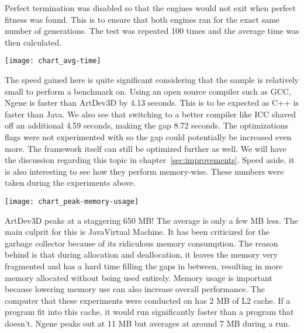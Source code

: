 Perfect termination was disabled so that the engines would not exit when perfect fitness was found. This is to ensure that both engines ran for the exact same number of generations. The test was repeated 100 times and the average time was then calculated.

\begin{center}\texttt{[image: chart\_avg-time]}\end{center}

The speed gained here is quite significant considering that the sample is relatively small to perform a benchmark on. Using an open source compiler such as GCC, Ngene is faster than ArtDev3D by 4.13 seconds. This is to be expected as C++ is faster than Java. We also see that switching to a better compiler like ICC shaved off an additional 4.59 seconds, making the gap 8.72 seconds. The optimizations flags were not experimented with so the gap could potentially be increased even more. The framework itself can still be optimized further as well. We will have the discussion regarding this topic in chapter~\ref{sec:improvements}. Speed aside, it is also interesting to see how they perform memory-wise. These numbers were taken during the experiments above.

\begin{center}\texttt{[image: chart\_peak-memory-usage]}\end{center}

ArtDev3D peaks at a staggering 650 MB! The average is only a few MB less. The main culprit for this is Java\texttrademark Virtual Machine. It has been criticized\cite{maio2008} for the garbage collector because of its ridiculous memory consumption. The reason behind is that during allocation and deallocation, it leaves the memory very fragmented and has a hard time filling the gaps in between, resulting in more memory allocated without being used entirely. Memory usage is important because lowering memory use can also increase overall performance. The computer that these experiments were conducted on has 2 MB of L2 cache. If a program fit into this cache, it would run significantly faster than a program that doesn't. Ngene peaks out at 11 MB but averages at around 7 MB during a run.
